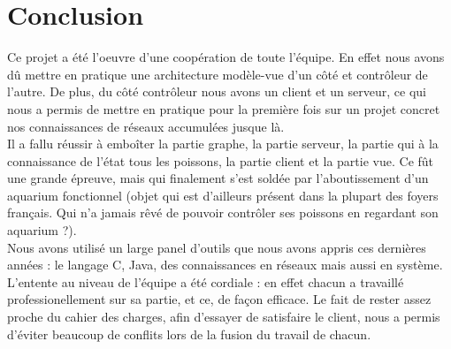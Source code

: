 \section{Conclusion}

\indent Ce projet a été l'oeuvre d'une coopération de toute l'équipe. En effet nous avons dû mettre en pratique une architecture modèle-vue d'un côté
et contrôleur de l'autre. De plus, du côté contrôleur nous avons un client et un serveur, ce qui nous a permis de mettre
en pratique pour la première fois sur un projet concret nos connaissances de réseaux accumulées jusque là.\\
\indent Il a fallu réussir à emboîter la partie graphe, la partie serveur, la partie qui à la connaissance de l'état tous les
poissons, la partie client et la partie vue. Ce fût une grande épreuve, mais qui finalement s'est soldée par l'aboutissement
d'un aquarium fonctionnel (objet qui est d'ailleurs présent dans la plupart des foyers français. Qui n'a jamais rêvé de pouvoir
contrôler ses poissons en regardant son aquarium ?).\\
\indent Nous avons utilisé un large panel d'outils que nous avons appris ces dernières années : le langage C, Java, des connaissances en réseaux
mais aussi en système. L'entente au niveau de l'équipe a été cordiale : en effet chacun a travaillé professionellement sur
sa partie, et ce, de façon efficace. Le fait de rester assez proche du cahier des charges, afin d'essayer de satisfaire le client, nous
a permis d'éviter beaucoup de conflits lors de la fusion du travail de chacun.
